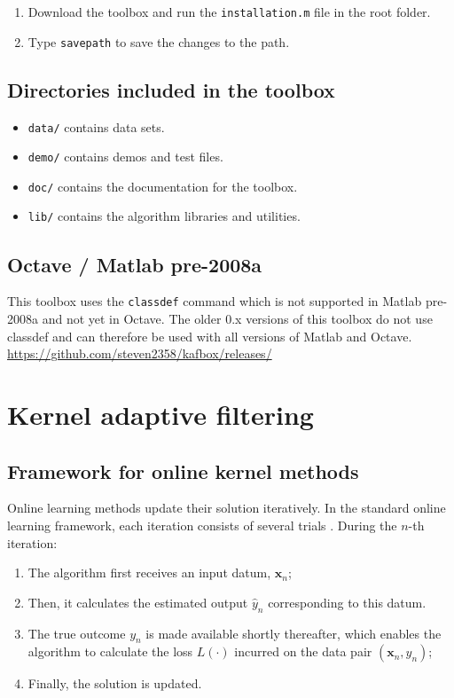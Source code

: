 \documentclass[]{report}
\def\x{{\mathbf x}}
\begin{document}
\begin{enumerate}
\item Download the toolbox and run the \verb"installation.m" file in the root folder.
\item Type \verb"savepath" to save the changes to the path.
\end{enumerate}

\section{Directories included in the toolbox}

\begin{itemize}
\item \verb"data/" contains data sets.
\item \verb"demo/" contains demos and test files.
\item \verb"doc/" contains the documentation for the toolbox.
\item \verb"lib/" contains the algorithm libraries and utilities.
\end{itemize}

\section{Octave / Matlab pre-2008a}

This toolbox uses the \verb"classdef" command which is not supported in Matlab pre-2008a and not yet in Octave. The older 0.x versions of this toolbox do not use classdef and can therefore be used with all versions of Matlab and Octave. \url{https://github.com/steven2358/kafbox/releases/}


\chapter{Kernel adaptive filtering}

\section{Framework for online kernel methods}

Online learning methods update their solution iteratively. In the standard online learning framework, each iteration consists of several trials \cite{blum1998line}. During the $n$-th iteration:
\begin{enumerate}
\item The algorithm first receives an input datum, $\x_n$;
\item Then, it calculates the estimated output $\hat y_n$ corresponding to this datum.
\item The true outcome $y_n$ is made available shortly thereafter, which enables the algorithm to calculate the loss $L(\cdot)$ incurred on the data pair $(\x_n,y_n)$;
\item Finally, the solution is updated.
\end{enumerate}
\end{document}
